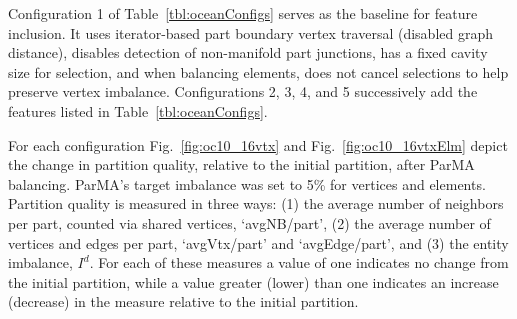 Configuration 1 of Table~\ref{tbl:oceanConfigs} serves as the baseline for
feature inclusion.
It uses iterator-based part boundary vertex traversal (disabled graph
distance), disables detection of non-manifold part junctions, has a fixed cavity
size for selection, and when balancing elements, does not cancel selections to
help preserve vertex imbalance.
Configurations 2, 3, 4, and 5 successively add the features listed in
Table~\ref{tbl:oceanConfigs}.

For each configuration Fig.~\ref{fig:oc10_16vtx} and Fig.~\ref{fig:oc10_16vtxElm}
depict the change in partition quality, relative to the initial partition,
after ParMA balancing.
ParMA's target imbalance was set to 5\% for vertices and elements.
Partition quality is measured in three ways:
(1) the average number of neighbors per part, counted via shared vertices,
`avgNB/part',
(2) the average number of vertices and edges per part, `avgVtx/part' and
`avgEdge/part', and
(3) the entity imbalance, $I^{d}$.
For each of these measures a value of one indicates no change from the initial
partition, while a value greater (lower) than one indicates an increase
(decrease) in the measure relative to the initial partition.

